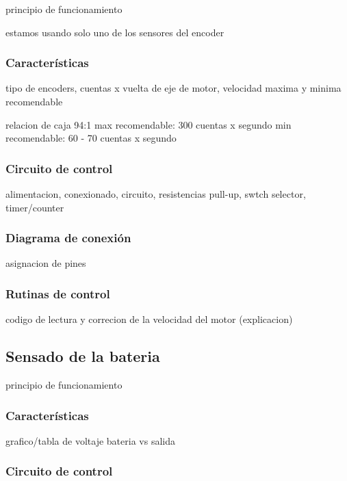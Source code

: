 principio de funcionamiento

estamos usando solo uno de los sensores del encoder

\subsubsection{Caracter\'isticas}
\label{h_sensado_encoder_caracteristicas}

tipo de encoders, cuentas x vuelta de eje de motor, velocidad maxima y minima recomendable

relacion de caja 94:1
max recomendable: 300 cuentas x segundo
min recomendable: 60 - 70 cuentas x segundo

\subsubsection{Circuito de control}
\label{h_sensado_encoder_circuito}

alimentacion, conexionado, circuito, resistencias pull-up, swtch selector, timer/counter

\subsubsection{Diagrama de conexi\'on}
\label{h_sensado_encoder_diagrama}

asignacion de pines

\subsubsection{Rutinas de control}
\label{h_sensado_encoder_rutinas}

codigo de lectura y correcion de la velocidad del motor (explicacion)

\subsection{Sensado de la bateria}
\label{h_sensado_bateria}

principio de funcionamiento

\subsubsection{Caracter\'isticas}
\label{h_sensado_bateria_caracteristicas}

grafico/tabla de voltaje bateria vs salida

\subsubsection{Circuito de control}
\label{h_sensado_bateria_circuito}

